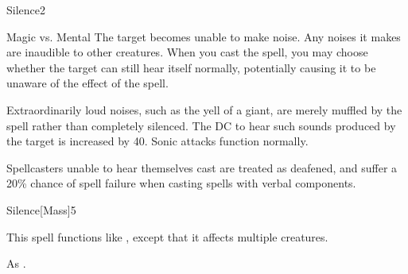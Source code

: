 \begin{spellsection}{Silence}{2}
    \begin{spellheader}
    \end{spellheader}
    \begin{spellcontent}
        \begin{spelltargetinginfo}
        \end{spelltargetinginfo}
        \begin{spelleffects}
            \begin{spellattack}{Magic vs. Mental}
                \spelleffect The target becomes unable to make noise. Any noises it makes are inaudible to other creatures. When you cast the spell, you may choose whether the target can still hear itself normally, potentially causing it to be unaware of the effect of the spell.

                Extraordinarily loud noises, such as the yell of a giant, are merely muffled by the spell rather than completely silenced. The DC to hear such sounds produced by the target is increased by 40. Sonic attacks function normally.
            \end{spellattack}
            \spelldur \durshort \dismissable
        \end{spelleffects}
    \end{spellcontent}
    \begin{spellfooter}
        \spellnotes Spellcasters unable to hear themselves cast are treated as deafened, and suffer a 20\% chance of spell failure when casting spells with verbal components.
        \miscastrandom
    \end{spellfooter}
\end{spellsection}

\begin{spellsection}{Silence}[Mass]{5}
    \begin{spellheader}
    \end{spellheader}
    \begin{spellcontent}
        \begin{spelltargetinginfo}
        \end{spelltargetinginfo}
        \begin{spelleffects}
            \spellspecial This spell functions like , except that it affects multiple creatures.
        \end{spelleffects}
    \end{spellcontent}
    \begin{spellfooter}
        \spellnotes As .
        \miscastexplode
    \end{spellfooter}
\end{spellsection}

